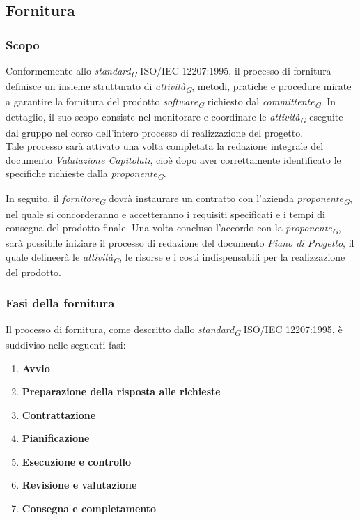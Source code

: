 \subsection{Fornitura}
\subsubsection{Scopo}
Conformemente allo \textit{standard}\textsubscript{\textit{G}} ISO/IEC 12207:1995, il processo di fornitura definisce un insieme strutturato di \textit{attività}\textsubscript{\textit{G}}, metodi, pratiche e procedure mirate a garantire la fornitura del prodotto \textit{software}\textsubscript{\textit{G}} richiesto dal \textit{committente}\textsubscript{\textit{G}}. 
In dettaglio, il suo scopo consiste nel monitorare e coordinare le \textit{attività}\textsubscript{\textit{G}} eseguite dal gruppo nel corso dell'intero processo di realizzazione del progetto. \\
Tale processo sarà attivato una volta completata la redazione integrale del documento \textit{Valutazione Capitolati}, cioè dopo aver correttamente identificato le specifiche richieste dalla \textit{proponente}\textsubscript{\textit{G}}. 

In seguito, il \textit{fornitore}\textsubscript{\textit{G}} dovrà instaurare un contratto con l'azienda \textit{proponente}\textsubscript{\textit{G}}, nel quale si concorderanno e accetteranno i requisiti specificati e i tempi di consegna del prodotto finale. Una volta concluso l'accordo con la \textit{proponente}\textsubscript{\textit{G}}, sarà possibile iniziare il processo di redazione del documento
\textit{Piano di Progetto}, il quale delineerà le \textit{attività}\textsubscript{\textit{G}}, le risorse e i costi indispensabili per la realizzazione del prodotto. 

\subsubsection{Fasi della fornitura}
Il processo di fornitura, come descritto dallo \textit{standard}\textsubscript{\textit{G}} ISO/IEC 12207:1995, è suddiviso nelle seguenti fasi:
\begin{enumerate}
    \item \textbf{Avvio}
    \item \textbf{Preparazione della risposta alle richieste}
    \item \textbf{Contrattazione}
    \item \textbf{Pianificazione}
    \item \textbf{Esecuzione e controllo}
    \item \textbf{Revisione e valutazione}
    \item \textbf{Consegna e completamento}
\end{enumerate}

